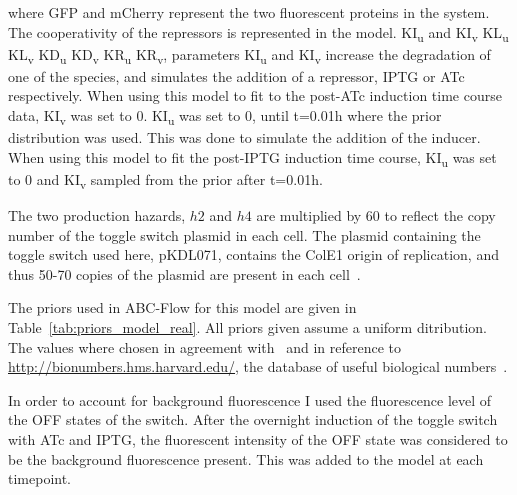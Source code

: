 \noindent where GFP and mCherry represent the two fluorescent proteins in the system. The cooperativity of the repressors is represented in the model. KI\textsubscript{u} and KI\textsubscript{v} KL\textsubscript{u} KL\textsubscript{v} KD\textsubscript{u} KD\textsubscript{v} KR\textsubscript{u} KR\textsubscript{v}, parameters KI\textsubscript{u} and KI\textsubscript{v} increase the degradation of one of the species, and simulates the addition of a repressor, IPTG or ATc respectively. When using this model to fit to the post-ATc induction time course data, KI\textsubscript{v} was set to 0. KI\textsubscript{u} was set to 0, until t=0.01h where the prior distribution was used. This was done to simulate the addition of the inducer. When using this model to fit the post-IPTG induction time course, KI\textsubscript{u} was set to 0 and KI\textsubscript{v} sampled from the prior after t=0.01h. 

The two production hazards, $h2$ and $h4$ are multiplied by 60 to reflect the copy number of the toggle switch plasmid in each cell. The plasmid containing the toggle switch used here, pKDL071, contains the ColE1 origin of replication, and thus 50-70 copies of the plasmid are present in each cell~\autocite{Milo:2010cz}. 

The priors used in ABC-Flow for this model are given in Table~\ref{tab:priors_model_real}. All priors given assume a uniform ditribution. The values where chosen in agreement with~\autocite{Lillacci:2013hu} and in reference to \url{http://bionumbers.hms.harvard.edu/}, the database of useful biological numbers~\autocite{Milo:2010cz}.

In order to account for background fluorescence I used the fluorescence level of the OFF states of the switch. After the overnight induction of the toggle switch with ATc and IPTG, the fluorescent intensity of the OFF state was considered to be the background fluorescence present. This was added to the model at each timepoint. 

